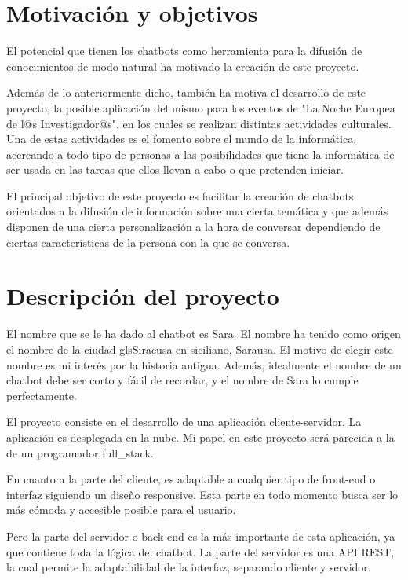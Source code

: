 \section{Motivación y objetivos}

El potencial que tienen los chatbots como herramienta para la difusión de conocimientos de modo natural ha motivado la creación de este proyecto.

Además de lo anteriormente dicho, también ha motiva el desarrollo de este proyecto, la posible aplicación del mismo para los eventos de "La Noche Europea de l@s Investigador@s", en los cuales se realizan distintas actividades culturales. Una de estas actividades es el fomento sobre el mundo de la informática, acercando a todo tipo de personas a las posibilidades que tiene la informática de ser usada en las tareas que ellos llevan a cabo o que pretenden iniciar.

El principal objetivo de este proyecto es facilitar la creación de chatbots orientados a la difusión de información sobre una cierta temática y que además disponen de una cierta personalización a la hora de conversar dependiendo de ciertas características de la persona con la que se conversa.

\section{Descripción del proyecto}

El nombre que se le ha dado al chatbot es Sara. El nombre ha tenido como origen el nombre de la ciudad gls{Siracusa} en siciliano, Sarausa. El motivo de elegir este nombre es mi interés por la historia antigua. Además, idealmente el nombre de un chatbot debe ser corto y fácil de recordar, y el nombre de Sara lo cumple perfectamente.

El proyecto consiste en el desarrollo de una aplicación cliente-servidor. La aplicación es desplegada en la nube. Mi papel en este proyecto será parecida a la de un programador \gls{full_stack}.

En cuanto a la parte del cliente, es adaptable a cualquier tipo de \gls{front-end} o interfaz siguiendo un diseño \gls{responsive}. Esta parte en todo momento busca ser lo más cómoda y accesible posible para el usuario.

Pero la parte del servidor o \gls{back-end} es la más importante de esta aplicación, ya que contiene toda la lógica del chatbot. La parte del servidor es una \gls{API REST}, la cual permite la adaptabilidad de la interfaz, separando cliente y servidor.

